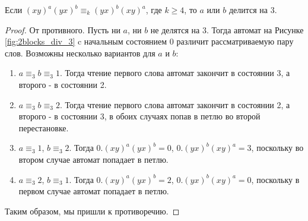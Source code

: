   \begin{lemma} \label{2blocks div 3}
 	Если $(xy)^a(yx)^b \equiv_k (yx)^b(xy)^a$, где $k \ge 4$, то $a$ или $b$ делится на 3.
 \end{lemma}
 \begin{proof}
 	От противного. Пусть ни $a$, ни $b$ не делятся на 3. Тогда автомат на Рисунке \ref{fig:2blocks_div_3} c начальным состоянием 0 различит рассматриваемую пару слов.
 	Возможны несколько вариантов для $a$ и $b$:
 	\begin{enumerate}
 		\item $a \equiv_3 b \equiv_3 1$. Тогда чтение первого слова автомат закончит в состоянии 3, а второго - в состоянии 2.
 		\item $a \equiv_3 b \equiv_3 2$. Тогда чтение первого слова автомат закончит в состоянии 2, а второго - в состоянии 3, в обоих случаях попав в петлю во второй перестановке.
 		\item $a \equiv_3 1$, $b \equiv_3 2$. Тогда $0.(xy)^a(yx)^b = 0$, $0.(yx)^b(xy)^a = 3$, поскольку во втором случае автомат попадает в петлю.
 		\item $a \equiv_3 2$, $b \equiv_3 1$. Тогда $0.(xy)^a(yx)^b = 2$, $0.(yx)^b(xy)^a = 0$, поскольку в первом случае автомат попадает в петлю.
 	\end{enumerate}
 	Таким образом, мы пришли к противоречию. 
 \end{proof}
 
